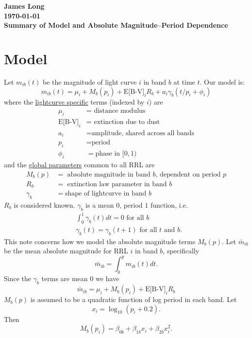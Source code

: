 \documentclass[12pt]{article}
\title{}
\date{}
\author{}
\begin{document}
\noindent
\textbf{James Long}\\
\textbf{\today}\\
\textbf{Summary of Model and Absolute Magnitude--Period Dependence}


\section{Model}

Let $m_{ib}(t)$ be the magnitude of light curve $i$ in band $b$ at time $t$. Our model is:
\begin{equation*}
m_{ib}(t) = \mu_i + M_{b}(p_i) + \text{E[B-V]}_iR_b + a_i\gamma_b(t/p_i + \phi_i)
\end{equation*}
where the \underline{lightcurve specific} terms (indexed by $i$) are 
\begin{align*}
  \mu_i &= \text{ distance modulus }\\
  \text{E[B-V]}_i &= \text{ extinction due to dust }\\
  a_i &= \text{amplitude, shared across all bands}\\
  p_i &= \text{period}\\
  \phi_i &= \text{phase in } [0,1)
\end{align*}
and the \underline{global parameters} common to all RRL are
\begin{align*}
  M_{b}(p) &= \text{ absolute magnitude in band $b$, dependent on period } p\\
  R_b &= \text{ extinction law parameter in band $b$}\\
  \gamma_b &= \text{shape of lightcurve in band $b$}
\end{align*}
$R_b$ is considered known. $\gamma_b$ is a mean $0$, period $1$ function, i.e.
\begin{align*}
  &\int_0^1 \gamma_b(t) dt = 0 \text{ for all } b\\
  &\gamma_b(t) = \gamma_b(t + 1) \text{ for all } t \text{ and } b.
\end{align*}
This note concerns how we model the absolute magnitude terms $M_b(p)$. Let $\bar{m}_{ib}$ be the mean absolute magnitude for RRL $i$ in band $b$, specifically
\begin{equation*}
  \bar{m}_{ib} = \int_0^p m_{ib}(t) dt.
\end{equation*}
Since the $\gamma_b$ terms are mean $0$ we have
\begin{equation*}
\bar{m}_{ib} = \mu_i + M_{b}(p_i) + \text{E[B-V]}_iR_b
\end{equation*}
$M_{b}(p)$ is assumed to be a quadratic function of log period in each band. Let
\begin{equation*}
  x_i = \log_{10}(p_i + 0.2).
\end{equation*}
Then
\begin{equation*}
  M_{b}(p_i) = \beta_{0b} + \beta_{1b}x_i  + \beta_{2b}x_i^2.
\end{equation*}
\end{document}
